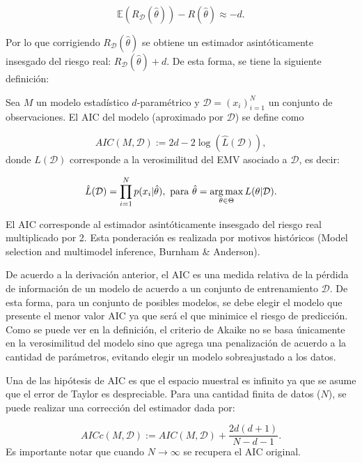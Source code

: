 \begin{equation}
	\mathbb{E}(R_\mathcal{D}(\hat{\theta})) - R(\hat{\theta}) \approx -d.
\end{equation}

Por lo que corrigiendo $R_\mathcal{D}(\hat{\theta})$ se obtiene un estimador asintóticamente insesgado del riesgo real: $R_\mathcal{D}(\hat{\theta})+d$. De esta forma, se tiene la siguiente definición:

\begin{definition}[AIC]
	Sea $M$ un modelo estadístico $d$-paramétrico y $\mathcal{D}=(x_i)_{i=1}^N$ un conjunto de observaciones. El AIC del modelo (aproximado por $\mathcal{D}$) se define como
	
	\begin{equation}
		AIC(M,\mathcal{D}):=2d-2\log\left(\hat{L}(\mathcal{D})\right),
	\end{equation}
donde $\hat{L}(\mathcal{D})$ corresponde a la verosimilitud del EMV asociado a $\mathcal{D}$, es decir:
	
	\begin{equation}
		\hat{L}(\mathcal{D}) = \prod_{i=1}^N p(x_i|\hat{\theta}),\text{ para } \hat{\theta} = \operatorname*{arg\,max}_{\theta\in\Theta} L(\theta|\mathcal{D}).
	\end{equation}
\end{definition}

\begin{remark}
El AIC corresponde al estimador asintóticamente insesgado del riesgo real multiplicado por 2. Esta ponderación es realizada por motivos históricos (Model selection and multimodel inference, Burnham \& Anderson).
\end{remark}

De acuerdo a la derivación anterior, el AIC es una medida relativa de la pérdida de información de un modelo de acuerdo a un conjunto de entrenamiento $\mathcal{D}$. De esta forma, para un conjunto de posibles modelos, se debe elegir el modelo que presente el menor valor AIC ya que será el que minimice el riesgo de predicción.\\

Como se puede ver en la definición, el criterio de Akaike no se basa únicamente en la verosimilitud del modelo sino que agrega una penalización de acuerdo a la cantidad de parámetros, evitando elegir un modelo sobreajustado a los datos. 

\begin{remark}
	Una de las hipótesis de AIC es que el espacio muestral es infinito ya que se asume que el error de Taylor es despreciable. Para una cantidad finita de datos ($N$), se puede realizar una corrección del estimador dada por:
	
	\begin{equation}
		AICc(M,\mathcal{D}) := AIC(M,\mathcal{D}) + \frac{2d(d+1)}{N-d-1}.
	\end{equation}
Es importante notar que cuando $N\to\infty$ se recupera el AIC original.
\end{remark}

